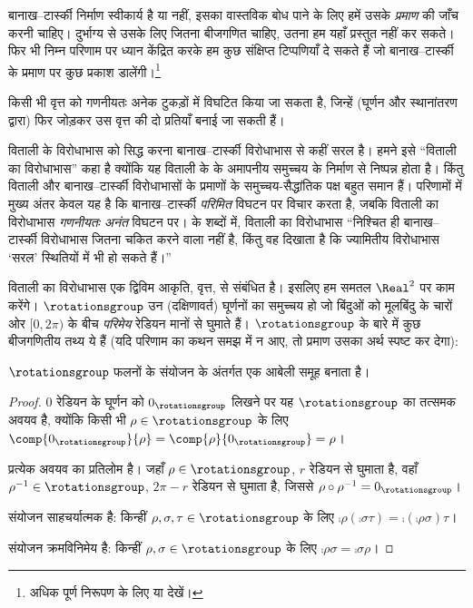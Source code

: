 \documentclass[../../../include/open-logic-section]{subfiles}
\begin{document}

बानाख--टार्स्की निर्माण स्वीकार्य है या नहीं, इसका वास्तविक बोध पाने के
लिए हमें उसके \emph{प्रमाण} की जाँच करनी चाहिए। दुर्भाग्य से उसके लिए जितना
बीजगणित चाहिए, उतना हम यहाँ प्रस्तुत नहीं कर सकते। फिर भी निम्न परिणाम पर
ध्यान केंद्रित करके हम कुछ संक्षिप्त टिप्पणियाँ दे सकते हैं जो
बानाख--टार्स्की के प्रमाण पर कुछ प्रकाश डालेंगी।\footnote{अधिक पूर्ण निरूपण
के लिए \cite{Weston2003} या \cite{Wagon2016} देखें।}

\begin{thm}[विताली का विरोधाभास ($\ZFC$ में)]
किसी भी वृत्त को गणनीयतः अनेक टुकड़ों में विघटित किया जा सकता है, जिन्हें
(घूर्णन और स्थानांतरण द्वारा) फिर जोड़कर उस वृत्त की दो प्रतियाँ बनाई जा
सकती हैं।
\end{thm}

विताली के विरोधाभास को सिद्ध करना बानाख--टार्स्की विरोधाभास से कहीं सरल है।
हमने इसे ``विताली का विरोधाभास'' कहा है क्योंकि यह विताली के
\citeyear{Vitali1905} के अमापनीय समुच्चय के निर्माण से निष्पन्न होता है।
किंतु विताली और बानाख--टार्स्की विरोधाभासों के प्रमाणों के समुच्चय-सैद्धांतिक
पक्ष बहुत समान हैं। परिणामों में मुख्य अंतर केवल यह है कि बानाख--टार्स्की
\emph{परिमित} विघटन पर विचार करता है, जबकि विताली का विरोधाभास
\emph{गणनीयतः अनंत} विघटन पर। \citet{Weston2003} के शब्दों में, विताली का
विरोधाभास ``निश्चित ही बानाख--टार्स्की विरोधाभास जितना चकित करने वाला नहीं
है, किंतु वह दिखाता है कि ज्यामितीय विरोधाभास `सरल' स्थितियों में भी हो सकते
हैं।''

विताली का विरोधाभास एक द्विविम आकृति, वृत्त, से संबंधित है। इसलिए हम समतल
$\Real^2$ पर काम करेंगे। $\rotationsgroup$ उन (दक्षिणावर्त) घूर्णनों का
समुच्चय हो जो बिंदुओं को मूलबिंदु के चारों ओर $[0,2\pi)$ के बीच
\emph{परिमेय} रेडियन मानों से घुमाते हैं। $\rotationsgroup$ के बारे में कुछ
बीजगणितीय तथ्य ये हैं (यदि परिणाम का कथन समझ में न आए, तो प्रमाण उसका अर्थ
स्पष्ट कर देगा):

\begin{lem}
$\rotationsgroup$ फलनों के संयोजन के अंतर्गत एक आबेली {समूह} बनाता है।
\end{lem}

\begin{proof}
$0$ रेडियन के घूर्णन को $0_{\rotationsgroup}$ लिखने पर यह
$\rotationsgroup$ का तत्समक अवयव है, क्योंकि किसी भी
$\rho\in\rotationsgroup$ के लिए
$\comp{0_{\rotationsgroup}}{\rho} = \comp{\rho}{0_{\rotationsgroup}} =
\rho$।

प्रत्येक अवयव का प्रतिलोम है। जहाँ $\rho\in\rotationsgroup$, $r$ रेडियन
से घुमाता है, वहाँ $\rho^{-1}\in\rotationsgroup$, $2\pi-r$ रेडियन से
घुमाता है, जिससे $\rho\circ\rho^{-1}=0_\rotationsgroup$।

संयोजन साहचर्यात्मक है: किन्हीं $\rho,\sigma,\tau\in\rotationsgroup$ के
लिए $\comp{\rho}{(\comp{\sigma}{\tau})}=
\comp{(\comp{\rho}{\sigma})}{\tau}$।

संयोजन क्रमविनिमेय है: किन्हीं $\rho,\sigma\in\rotationsgroup$ के लिए
$\comp{\rho}{\sigma}=\comp{\sigma}{\rho}$।
\end{proof}
\end{document}
